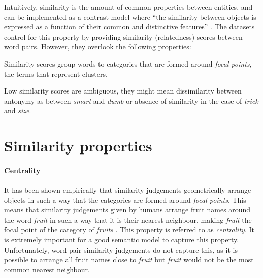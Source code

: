 \documentclass[11pt]{article}
\begin{document}
Intuitively, similarity is the amount of common properties between entities, and can be implemented as a contrast model where ``the similarity between objects is expressed as a function of their common and distinctive features'' \cite{Tversky1977}. The datasets control for this property by providing similarity (relatedness) scores between word pairs.
%
However, they overlook the following properties:
\begin{compactitem}
    \item Similarity scores group words to categories that are formed around \emph{focal points}, the terms that represent clusters.
    \item Low similarity scores are ambiguous, they might mean dissimilarity between antonymy as between \textit{smart} and \textit{dumb} or absence of similarity in the case of \textit{trick} and \textit{size}.
\end{compactitem}


\section{Similarity properties}

\paragraph{Centrality}

It has been shown empirically that similarity judgements geometrically arrange objects in such a way that the categories are formed around \emph{focal points}. This means that similarity judgements given by humans arrange fruit names around the word \textit{fruit} in such a way that it is their nearest neighbour, making \textit{fruit} the focal point of the category of \textit{fruits} \cite{1986-13502-00119860101}. This property is referred to as \emph{centrality}.
%
It is extremely important for a good semantic model to capture this property. Unfortunately, word pair similarity judgements do not capture this, as it is possible to arrange all fruit names close to \textit{fruit} but \textit{fruit} would not be the most common nearest neighbour. 
\end{document}
